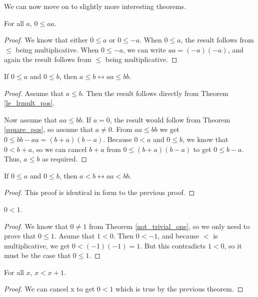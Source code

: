 \documentclass[../../math.tex]{subfiles}
\begin{document}
We can now move on to slightly more interesting theorems.

\begin{theorem} \label{square_pos}
    For all $a$, $0 \leq aa$.
\end{theorem}
\begin{proof}
    We know that either $0 \leq a$ or $0 \leq -a$.  When $0 \leq a$, the result
    follows from $\leq$ being multiplicative.  When $0 \leq -a$, we can write
    $aa = (-a)(-a)$, and again the result follows from $\leq$ being
    multiplicative.
\end{proof}

\begin{theorem}
    If $0 \leq a$ and $0 \leq b$, then $a \leq b \leftrightarrow aa \leq bb$.
\end{theorem}
\begin{proof}
    Assume that $a \leq b$.  Then the result follows directly from Theorem
    \ref{le_lrmult_pos}.

    Now assume that $aa \leq bb$.  If $a = 0$, the result would follow from
    Theorem \ref{square_pos}, so assume that $a \neq 0$.  From $aa \leq bb$ we
    get $0 \leq bb - aa = (b + a)(b - a)$.  Because $0 < a$ and $0 \leq b$, we
    know that $0 < b + a$, so we can cancel $b + a$ from $0 \leq (b + a)(b - a)$
    to get $0 \leq b - a$.  Thus, $a \leq b$ as required.
\end{proof}

\begin{theorem}
    If $0 \leq a$ and $0 \leq b$, then $a < b \leftrightarrow aa < bb$.
\end{theorem}
\begin{proof}
    This proof is identical in form to the previous proof.
\end{proof}

\begin{theorem} \label{one_pos}
    $0 < 1$.
\end{theorem}
\begin{proof}
    We know that $0 \neq 1$ from Theorem \ref{not_trivial_one}, so we only need
    to prove that $0 \leq 1$.  Asume that $1 < 0$.  Then $0 < -1$, and because
    $<$ is multiplicative, we get $0 < (-1)(-1) = 1$.  But this contradicts $1 <
    0$, so it must be the case that $0 \leq 1$.
\end{proof}

\begin{theorem}
    For all $x$, $x < x + 1$.
\end{theorem}
\begin{proof}
    We can cancel x to get $0 < 1$ which is true by the previous theorem.
\end{proof}
\end{document}
